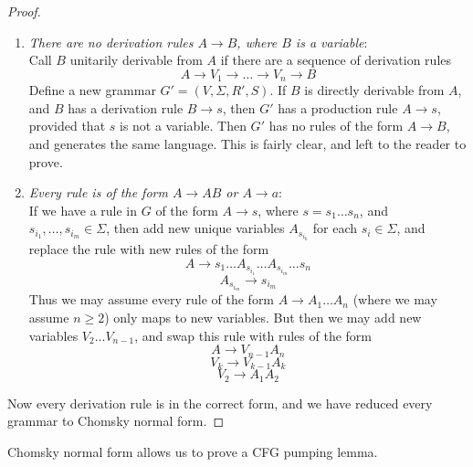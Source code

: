 \begin{proof}
\begin{enumerate}
        \item \emph{There are no derivation rules $A \rightarrow B$, where $B$ is a variable}:\\
        Call $B$ unitarily derivable from $A$ if there are a sequence of derivation rules
        \[ A \rightarrow V_1 \rightarrow \dots \rightarrow V_n \rightarrow B \]
        Define a new grammar $G' = (V,\Sigma,R',S)$. If $B$ is directly derivable from $A$, and $B$ has a derivation rule $B \rightarrow s$, then $G'$ has a production rule $A \rightarrow s$, provided that $s$ is not a variable. Then $G'$ has no rules of the form $A \rightarrow B$, and generates the same language. This is fairly clear, and left to the reader to prove.

        \item \emph{Every rule is of the form $A \rightarrow AB$ or $A \rightarrow a$}:\\
        If we have a rule in $G$ of the form $A \rightarrow s$, where $s = s_1 \dots s_n$, and $s_{i_1}, \dots, s_{i_m} \in \Sigma$, then add new unique variables $A_{s_{i_k}}$ for each $s_i \in \Sigma$, and replace the rule with new rules of the form
        \[ A \rightarrow s_1 \dots A_{s_{i_1}} \dots A_{s_{i_m}} \dots s_n \]
        \[ A_{s_{i_m}} \rightarrow s_{i_m} \]
        Thus we may assume every rule of the form $A \rightarrow A_1 \dots A_n$ (where we may assume $n \geq 2$) only maps to new variables. But then we may add new variables $V_2 \dots V_{n-1}$, and swap this rule with rules of the form
        \[ A \rightarrow V_{n-1} A_n \]
        \[ V_k \rightarrow V_{k-1} A_k \]
        \[ V_2 \rightarrow A_1 A_2 \]
    \end{enumerate}
    Now every derivation rule is in the correct form, and we have reduced every grammar to Chomsky normal form.
\end{proof}

Chomsky normal form allows us to prove a CFG pumping lemma.

